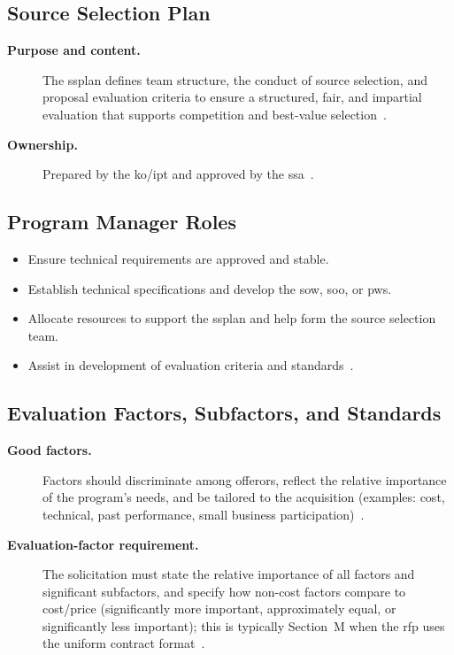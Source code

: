\documentclass[../main.tex]{subfiles}
\begin{document}
\subsection{Source Selection Plan}
\begin{description}
  \item[\textbf{Purpose and content.}] The \ac{ssplan} defines team structure, the conduct of source selection, and proposal evaluation criteria to ensure a structured, fair, and impartial evaluation that supports competition and best-value selection~\autocite{edo-3-2-5-source-selection-practical-2025}.
  \item[\textbf{Ownership.}] Prepared by the \ac{ko}/\ac{ipt} and approved by the \ac{ssa}~\autocite{edo-3-2-5-source-selection-practical-2025}.
\end{description}

\subsection{Program Manager Roles}
\begin{itemize}
  \item Ensure technical requirements are approved and stable.
  \item Establish technical specifications and develop the \ac{sow}, \ac{soo}, or \ac{pws}.
  \item Allocate resources to support the \ac{ssplan} and help form the source selection team.
  \item Assist in development of evaluation criteria and standards~\autocite{edo-3-2-5-source-selection-practical-2025}.
\end{itemize}

\subsection{Evaluation Factors, Subfactors, and Standards}
\begin{description}
  \item[\textbf{Good factors.}] Factors should discriminate among offerors, reflect the relative importance of the program's needs, and be tailored to the acquisition (examples: cost, technical, past performance, small business participation)~\autocite{edo-3-2-5-source-selection-practical-2025}.
  \item[\textbf{Evaluation-factor requirement.}] The solicitation must state the relative importance of all factors and significant subfactors, and specify how non-cost factors compare to cost/price (significantly more important, approximately equal, or significantly less important); this is typically Section~M when the \ac{rfp} uses the uniform contract format~\autocite{edo-3-2-5-source-selection-practical-2025,FAR}.
\end{description}
\end{document}
